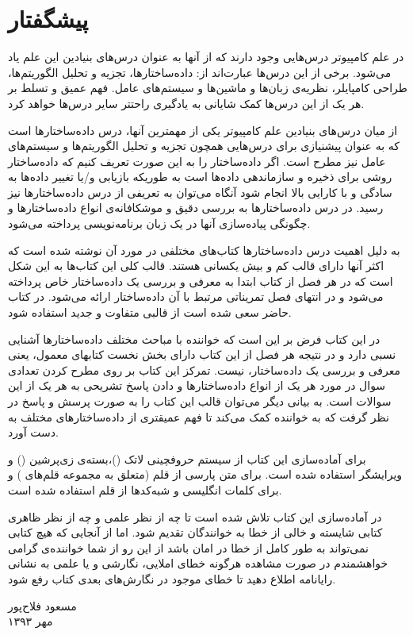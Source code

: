 \section*{پیشگفتار}
در علم کامپیوتر درس‌هایی وجود دارند که از آنها به عنوان درس‌های بنیادین این علم یاد می‌شود. برخی از این درس‌ها عبارت‌اند از: داده‌ساختارها، تجزیه و تحلیل الگوریتم‌ها، طراحی کامپایلر، نظریه‌ی زبان‌ها و ماشین‌ها و سیستم‌های عامل. فهم عمیق و تسلط بر هر یک از این درس‌ها کمک شایانی به یادگیری راحتتر سایر درس‌ها خواهد کرد.

از میان درس‌های بنیادین علم کامپیوتر یکی از مهمترین آنها، درس داده‌ساختارها است که به عنوان پیشنیازی برای درس‌هایی همچون تجزیه و تحلیل الگوریتم‌ها و سیستم‌های عامل نیز مطرح است. اگر داده‌ساختار را به این صورت تعریف کنیم که {\prq}داده‌ساختار روشی برای ذخیره و سازماندهی داده‌ها است به طوریکه بازیابی و/یا تغییر داده‌ها به سادگی و با کارایی بالا انجام شود{\plq} آنگاه می‌توان به تعریفی از درس داده‌ساختارها نیز رسید. در درس داده‌ساختارها به بررسی دقیق و موشکافانه‌ی انواع داده‌ساختارها و چگونگی پیاده‌سازی آنها در یک زبان برنامه‌نویسی پرداخته می‌شود.

به دلیل اهمیت درس داده‌ساختارها کتاب‌های مختلفی در مورد آن نوشته شده است که اکثر آنها دارای قالب کم و بیش یکسانی هستند. قالب کلی این کتاب‌ها به این شکل است که در هر فصل از کتاب ابتدا به معرفی و بررسی یک داده‌ساختار خاص پرداخته می‌شود و در انتهای فصل تمریناتی مرتبط با آن داده‌ساختار ارائه می‌شود. در کتاب حاضر سعی شده است از قالبی متفاوت و جدید استفاده شود.

در این کتاب فرض بر این است که خواننده با مباحث مختلف داده‌ساختارها آشنایی نسبی دارد و در نتیجه هر فصل از این کتاب دارای بخش نخست کتابهای معمول، یعنی معرفی و بررسی یک داده‌ساختار، نیست. تمرکز این کتاب بر روی مطرح کردن تعدادی سوال در مورد هر یک از انواع داده‌ساختارها و دادن پاسخ تشریحی به هر یک از این سوالات است. به بیانی دیگر می‌توان قالب این کتاب را به صورت پرسش و پاسخ در نظر گرفت که به خواننده کمک می‌کند تا فهم عمیقتری از داده‌ساختارهای مختلف به دست آورد.

برای آماده‌سازی این کتاب از سیستم حروفچینی لاتک ({\lr{\LaTeX}})،بسته‌ی زی‌پرشین ({\lr{\XePersian}}) و ویرایشگر {} استفاده شده است. برای متن پارسی از قلم {} (متعلق به مجموعه قلم‌های {}) و برای کلمات انگلیسی و شبه‌کدها از قلم {} استفاده شده است.

در آماده‌سازی این کتاب تلاش شده است تا چه از نظر علمی و چه از نظر ظاهری کتابی شایسته و خالی از خطا به خوانندگان تقدیم شود. اما از آنجایی که هیچ کتابی نمی‌تواند به طور کامل از خطا در امان باشد از این رو از شما خواننده‌ی گرامی خواهشمندم در صورت مشاهده هرگونه خطای املایی، نگارشی و یا علمی به نشانی رایانامه {} اطلاع دهید تا خطای موجود در نگارش‌های بعدی کتاب رفع شود.

\begin{flushleft}
\small
مسعود فلاح‌پور\\
مهر ۱۳۹۳
\end{flushleft}